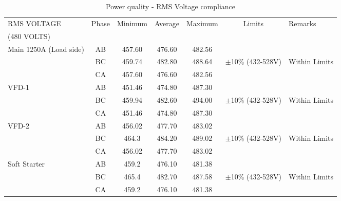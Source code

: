 \begin{table}[!htb]
	\caption{Power quality - RMS Voltage compliance}
	\label{tbl_ch04_elecaudit_powerquality_rms}
	{\scriptsize
		
		\begin{tabular}{l|l|l|l|l|p{2cm}|l}
\hline
RMS VOLTAGE & \multicolumn{1}{c|}{Phase} & \multicolumn{1}{c|}{Minimum} & \multicolumn{1}{c|}{Average} & \multicolumn{1}{c|}{Maximum} & \multicolumn{1}{c|}{Limits} & Remarks \\ 
(480 VOLTS) & \multicolumn{1}{c|}{} & \multicolumn{1}{c|}{} & \multicolumn{1}{c|}{} & \multicolumn{1}{c|}{} & \multicolumn{1}{c|}{} &  \\ 
\hline
Main 1250A (Load side) & \multicolumn{1}{c|}{AB} & \multicolumn{1}{c|}{457.60} & \multicolumn{1}{c|}{476.60} & \multicolumn{1}{c|}{482.56} & \multicolumn{1}{c|}{} &  \\ 
& \multicolumn{1}{c|}{BC} & \multicolumn{1}{c|}{459.74} & \multicolumn{1}{c|}{482.80} & \multicolumn{1}{c|}{488.64} & \multicolumn{1}{c|}{$\pm $10\% (432-528V)} & Within  Limits \\ 
& \multicolumn{1}{c|}{CA} & \multicolumn{1}{c|}{457.60} & \multicolumn{1}{c|}{476.60} & \multicolumn{1}{c|}{482.56} & \multicolumn{1}{c|}{} &  \\ 
\hline
VFD-1 & \multicolumn{1}{c|}{AB} & \multicolumn{1}{c|}{451.46} & \multicolumn{1}{c|}{474.80} & \multicolumn{1}{c|}{487.30} & \multicolumn{1}{c|}{} &  \\ 
& \multicolumn{1}{c|}{BC} & \multicolumn{1}{c|}{459.94} & \multicolumn{1}{c|}{482.60} & \multicolumn{1}{c|}{494.00} & \multicolumn{1}{c|}{$\pm $10\% (432-528V)} & Within Limits \\ 
& \multicolumn{1}{c|}{CA} & \multicolumn{1}{c|}{451.46} & \multicolumn{1}{c|}{474.80} & \multicolumn{1}{c|}{487.30} & \multicolumn{1}{c|}{} &  \\ 
\hline
VFD-2 & \multicolumn{1}{c|}{AB} & \multicolumn{1}{c|}{456.02} & \multicolumn{1}{c|}{477.70} & \multicolumn{1}{c|}{483.02} & \multicolumn{1}{c|}{} &  \\ 
& \multicolumn{1}{c|}{BC} & \multicolumn{1}{c|}{464.3} & \multicolumn{1}{c|}{484.20} & \multicolumn{1}{c|}{489.02} & \multicolumn{1}{c|}{$\pm $10\% (432-528V)} & Within Limits \\ 
& \multicolumn{1}{c|}{CA} & \multicolumn{1}{c|}{456.02} & \multicolumn{1}{c|}{477.70} & \multicolumn{1}{c|}{483.02} & \multicolumn{1}{c|}{} &  \\ 
\hline
Soft Starter & \multicolumn{1}{c|}{AB} & \multicolumn{1}{c|}{459.2} & \multicolumn{1}{c|}{476.10} & \multicolumn{1}{c|}{481.38} & \multicolumn{1}{c|}{} &  \\ 
& \multicolumn{1}{c|}{BC} & \multicolumn{1}{c|}{465.4} & \multicolumn{1}{c|}{482.70} & \multicolumn{1}{c|}{487.58} & \multicolumn{1}{c|}{$\pm $10\% (432-528V)} & Within Limits \\ 
& \multicolumn{1}{c|}{CA} & \multicolumn{1}{c|}{459.2} & \multicolumn{1}{c|}{476.10} & \multicolumn{1}{c|}{481.38} & \multicolumn{1}{c|}{} &  \\ 
\hline			
		\end{tabular}
		
	}%
\end{table}